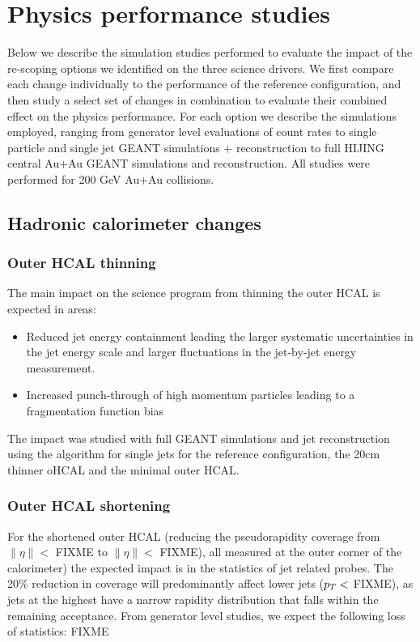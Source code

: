 

\chapter{Physics performance studies}
\label{cha:performance}

Below we describe the simulation studies performed to evaluate the impact of the re-scoping options we identified on the three 
science drivers. We  first compare each change individually to the performance of the reference configuration, and then study
a select set of changes in combination to evaluate their combined effect on the physics performance. For each option we 
describe the simulations employed, ranging from generator level evaluations of count rates to single particle and single jet
GEANT simulations + reconstruction to full HIJING central Au+Au GEANT simulations and reconstruction. All studies were 
performed for 200 GeV Au+Au collisions.
\section{Hadronic calorimeter changes}
\subsection{Outer HCAL thinning}
The main impact on the science program from thinning the outer HCAL is expected in areas:
\begin{itemize} 
\item Reduced jet energy containment leading the larger systematic uncertainties in the jet energy scale and larger fluctuations
in the jet-by-jet energy measurement.
\item Increased punch-through of high momentum particles leading to a fragmentation function bias
\end{itemize}
The impact was studied with full GEANT simulations and jet reconstruction using the \antikt algorithm for single jets 
for the reference configuration, the 20cm thinner oHCAL and the minimal outer HCAL. 
\subsection{Outer HCAL shortening}

For the shortened outer HCAL (reducing the pseudorapidity coverage from $\| \eta \| <$ FIXME to $\| \eta \| < $ FIXME), all measured
at the outer corner of the calorimeter) the expected impact 
is in the statistics of jet related probes. The 20\% reduction in coverage will predominantly affect lower \pt jets ($\mbox{${p_T}$} <$ FIXME),
as jets at the highest \pT have a narrow rapidity distribution that falls within the remaining acceptance. From generator level 
studies, we expect the following loss of statistics: FIXME

